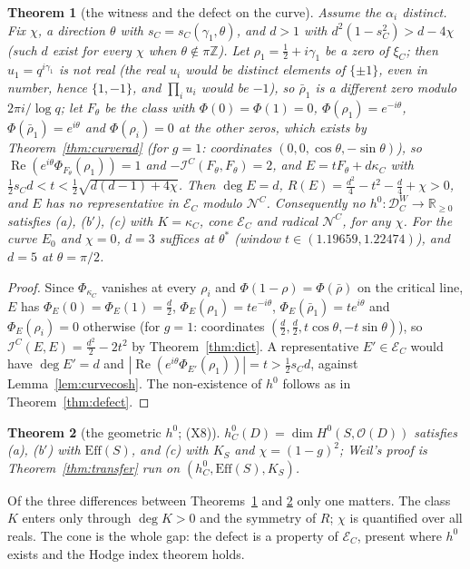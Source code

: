 \documentclass[11pt]{amsart}
\newtheorem{theorem}{Theorem}[section]
\theoremstyle{definition}
\theoremstyle{remark}
\newcommand{\R}{\mathbb R}
\newcommand{\Z}{\mathbb Z}
\newcommand{\Rel}{\operatorname{Re}}
\newcommand{\DW}{\mathcal D^{W}}
\newcommand{\Nr}{\mathcal N}
\newcommand{\Ef}{\mathcal E}
\newcommand{\I}{\mathcal I}
\newcommand{\dg}{\deg}
\newcommand{\Kc}{\kappa_C}
\begin{document}
\begin{theorem}[the witness and the defect on the curve]\label{thm:curvedefect}
Assume the $\alpha_i$ distinct. Fix $\chi$, a direction $\theta$ with $s_C=s_C(\gamma_1,\theta)$, and $d>1$ with $d^2(1-s_C^2)>d-4\chi$ (such $d$ exist for every $\chi$ when $\theta\notin\pi\Z$). Let $\rho_1=\frac12+i\gamma_1$ be a zero of $\xi_C$; then $u_1=q^{i\gamma_1}$ is not real (the real $u_i$ would be distinct elements of $\{\pm1\}$, even in number, hence $\{1,-1\}$, and $\prod_iu_i$ would be $-1$), so $\bar\rho_1$ is a different zero modulo $2\pi i/\log q$; let $F_\theta$ be the
class with $\Phi(0)=\Phi(1)=0$, $\Phi(\rho_1)=e^{-i\theta}$, $\Phi(\bar\rho_1)=e^{i\theta}$ and $\Phi(\rho_i)=0$ at the other zeros, which exists by Theorem~\ref{thm:curverad} (for $g=1$: coordinates $(0,0,\cos\theta,-\sin\theta)$), so $\Rel(e^{i\theta}\Phi_{F_\theta}(\rho_1))=1$ and $-\I^C(F_\theta,F_\theta)=2$, and
$E=tF_\theta+d\Kc$ with $\frac12s_Cd<t<\frac12\sqrt{d(d-1)+4\chi}$. Then $\dg E=d$, $R(E)=\frac{d^2}4-t^2-\frac d4+\chi>0$, and
$E$ has no representative in $\Ef_C$ modulo $\Nr^C$. Consequently no $h^0:\DW_C\to\R_{\ge0}$ satisfies (a), (b$'$), (c)
with $K=\Kc$, cone $\Ef_C$ and radical $\Nr^C$, for any $\chi$. For the curve $E_0$ and $\chi=0$, $d=3$ suffices at $\theta^*$
(window $t\in(1.19659,1.22474)$), and $d=5$ at $\theta=\pi/2$.
\end{theorem}
\begin{proof}
Since $\Phi_{\Kc}$ vanishes at every $\rho_i$ and $\Phi(1-\rho)=\Phi(\bar\rho)$ on the critical line, $E$ has $\Phi_E(0)=\Phi_E(1)=\frac d2$, $\Phi_E(\rho_1)=te^{-i\theta}$, $\Phi_E(\bar\rho_1)=te^{i\theta}$ and $\Phi_E(\rho_i)=0$ otherwise (for $g=1$: coordinates $(\frac d2,\frac d2,t\cos\theta,-t\sin\theta)$), so $\I^C(E,E)=\frac{d^2}2-2t^2$ by Theorem~\ref{thm:dict}. A representative
$E'\in\Ef_C$ would have $\dg E'=d$ and $|\Rel(e^{i\theta}\Phi_{E'}(\rho_1))|=t>\frac12s_Cd$, against
Lemma~\ref{lem:curvecosh}. The non-existence of $h^0$ follows as in Theorem~\ref{thm:defect}.
\end{proof}

\begin{theorem}[the geometric $h^0$; (X8)]\label{thm:geomh0}
$h^0_C(D)=\dim H^0(S,\mathcal O(D))$ satisfies (a), (b$'$) with $\mathrm{Eff}(S)$, and (c) with $K_S$ and
$\chi=(1-g)^2$; Weil's proof is Theorem~\ref{thm:transfer} run on $(h^0_C,\mathrm{Eff}(S),K_S)$.
\end{theorem}

Of the three differences between Theorems~\ref{thm:curvedefect} and \ref{thm:geomh0} only one matters. The
class $K$ enters only through $\dg K>0$ and the symmetry of $R$; $\chi$ is quantified over all reals. The
cone is the whole gap: the defect is a property of $\Ef_C$, present where $h^0$ exists and the Hodge index
theorem holds.
\end{document}
